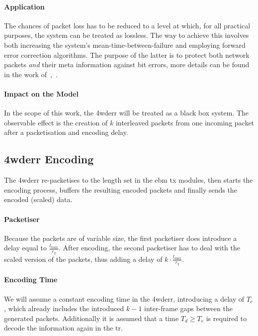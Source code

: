 \paragraph{Application}
The chances of packet loss has to be reduced to a level at which, for all practical purposes, the system can be treated as lossless.
The way to achieve this involves both increasing the system's mean-time-between-failure and employing forward error correction algorithms. 
The purpose of the latter is to protect both network packets \emph{and} their meta information against bit errors, more details can be found in the work of~\citeauthor{prados_boda_fec_2010},~\cite{prados_boda_fec_2010}. 
\paragraph{Impact on the Model}
In the scope of this work, the \gls{4wderr} will be treated as a black box system. The observable effect is the creation of $k$ interleaved packets from one incoming packet after a packetisation and encoding delay.

\subsection{\gls{4wderr} Encoding}
The \gls{4wderr} re-packetises to the length set in the \gls{ebm} \gls{tx} modules, then starts the encoding process, buffers the resulting encoded packets and finally sends the encoded (scaled) data.

\paragraph{Packetiser} Because the packets are of variable size, the first packetiser does introduce a delay equal to $\frac{l_{max}}{r_2}$. After encoding,
the second packetiser has to deal with the scaled version of the packets, thus adding a delay of $k \cdot \frac{  l_{max}}{r_2}$.

\paragraph{Encoding Time}
We will assume a constant encoding time in the \gls{4wderr}, introducing a delay of $T_e$, which already includes the introduced $k-1$ inter-frame gaps between the generated packets.
Additionally it is assumed that a time $T_d \ge T_e$ is required to decode the information again in the \gls{tr}.

